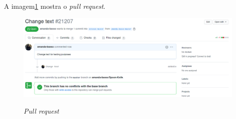     A imagem\ref{figura:result_fork} mostra o \textit{pull request}.
    
    \begin{figure}[H]
        \caption{\textit{Pull request}}
        \vspace{0.5cm}
        \centering
        \includegraphics[width=15cm]{imagens/result_fork.png}
        \label{figura:result_fork}
    \end{figure}
